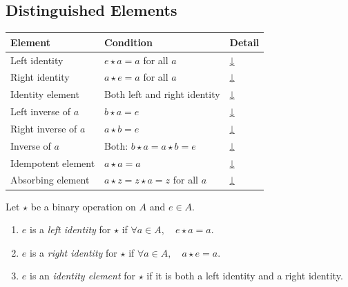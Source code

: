 
\subsection{Distinguished Elements}

\begin{tcolorbox}[colback=gray!6, colframe=gray!40, arc=2pt,
  left=6pt, right=6pt, top=4pt, bottom=4pt,
  title={\small\textbf{Distinguished Elements — Quick Reference}},
  fonttitle=\small\bfseries]
\small
\begin{tabular}{l l l}
\toprule
\textbf{Element} & \textbf{Condition} & \textbf{Detail} \\
\midrule
Left identity     & $e \star a = a$ for all $a$                     & \hyperref[def:identity-element]{↓} \\
Right identity    & $a \star e = a$ for all $a$                     & \hyperref[def:identity-element]{↓} \\
Identity element  & Both left and right identity                    & \hyperref[def:identity-element]{↓} \\
Left inverse of $a$   & $b \star a = e$                             & \hyperref[def:inverse-element]{↓} \\
Right inverse of $a$  & $a \star b = e$                             & \hyperref[def:inverse-element]{↓} \\
Inverse of $a$        & Both: $b \star a = a \star b = e$           & \hyperref[def:inverse-element]{↓} \\
Idempotent element    & $a \star a = a$                             & \hyperref[def:idempotent-element]{↓} \\
Absorbing element     & $a \star z = z \star a = z$ for all $a$     & \hyperref[def:absorbing-element]{↓} \\
\bottomrule
\end{tabular}
\end{tcolorbox}

\vspace{1em}

\begin{tcolorbox}[colback=propbox, colframe=propborder, arc=2pt,
  left=6pt, right=6pt, top=4pt, bottom=4pt,
  title={\small\textbf{Definition (Identity Element)}},
  fonttitle=\small\bfseries]
\label{def:identity-element}
Let $\star$ be a binary operation on $A$ and $e \in A$.
\begin{enumerate}[label=(\roman*)]
  \item $e$ is a \emph{left identity} for $\star$ if
        $\forall a \in A,\quad e \star a = a$.
  \item $e$ is a \emph{right identity} for $\star$ if
        $\forall a \in A,\quad a \star e = a$.
  \item $e$ is an \emph{identity element} for $\star$ if it is both a
        left identity and a right identity.
\end{enumerate}
\end{tcolorbox}

